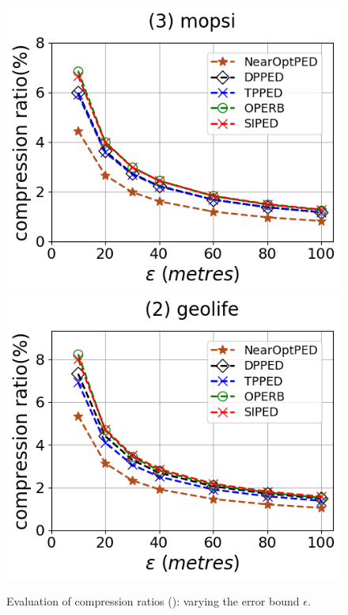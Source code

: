 \begin{figure}[tb!]
	\includegraphics[scale=0.315]{Figures/Exp-PED-CR-epsilon-mopsi.png}		\hspace{1ex}
	\includegraphics[scale=0.315]{Figures/Exp-PED-CR-epsilon-geolife.png}
	\vspace{-2.5ex}
	\caption{\small Evaluation of compression ratios (\ped): varying the error bound $\epsilon$.}
	\label{fig:cr-ped}
	\vspace{-1ex}
\end{figure}

